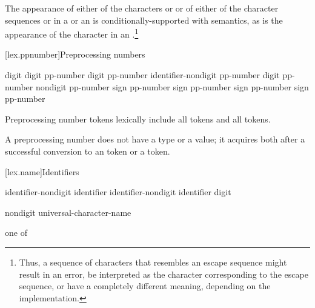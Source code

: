 \pnum
The appearance of either of the characters  or \tcode{\textbackslash} or of
either of the character sequences \tcode{/*} or \tcode{//} in a
 or an 
is conditionally-supported with  semantics, as is the appearance of the character
 in an .\footnote{Thus, a sequence of characters
that resembles an escape sequence might result in an error, be interpreted as the
character corresponding to the escape sequence, or have a completely different meaning,
depending on the implementation.}%

[lex.ppnumber]{Preprocessing numbers}

%
\begin{bnf}
\br
    digit\br
     digit\br
    pp-number digit\br
    pp-number identifier-nondigit\br
    pp-number  digit\br
    pp-number  nondigit\br
    pp-number  sign\br
    pp-number  sign\br
    pp-number  sign\br
    pp-number  sign\br
    pp-number 
\end{bnf}

\pnum
Preprocessing number tokens lexically include
all  tokens and
all  tokens.

\pnum
A preprocessing number does not have a type or a value; it acquires both
after a successful conversion to
an  token or
a  token.%

[lex.name]{Identifiers}

%
\begin{bnf}
\br
    identifier-nondigit\br
    identifier identifier-nondigit\br
    identifier digit
\end{bnf}

\begin{bnf}
\br
    nondigit\br
    universal-character-name
\end{bnf}

\begin{bnf}
 \textnormal{one of}\br
    \br
    \br
    \br
\end{bnf}


